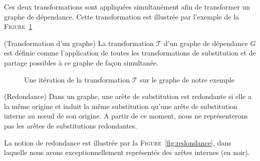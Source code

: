 Ces deux transformations sont appliquées simultanément afin de
transformer un graphe de dépendance. Cette transformation est illustrée
par l'exemple de la \textsc{Figure}~\ref{fig:etape_de_monomorphisation}

\begin{mydef} (Transformation d'un graphe)
La transformation $\mathcal{T}$ d'un graphe de dépendance $G$ est définie comme l'application de toutes les transformations de substitution et de partage possibles à ce graphe de façon simultanée.
\end{mydef}

\begin{figure}[h!]
\begin{center}
\end{center}
\caption{Une itération de la transformation $\mathcal{T}$ sur le graphe de notre exemple}
\label{fig:etape_de_monomorphisation}
\end{figure}


\begin{mydef} (Redondance)
Dans un graphe, une arête de substitution est redondante si elle a la m\^eme origine et induit la m\^eme substitution qu'une arête de substitution interne au nœud de son origine. A partir de ce moment, nous ne représenterons pas les arêtes de substitutions redondantes.
\end{mydef}

La notion de redondance est illustrée par la \textsc{Figure}~\ref{fig:redondance}, dans laquelle nous avons exceptionnellement représentés des arêtes internes (en noir).

